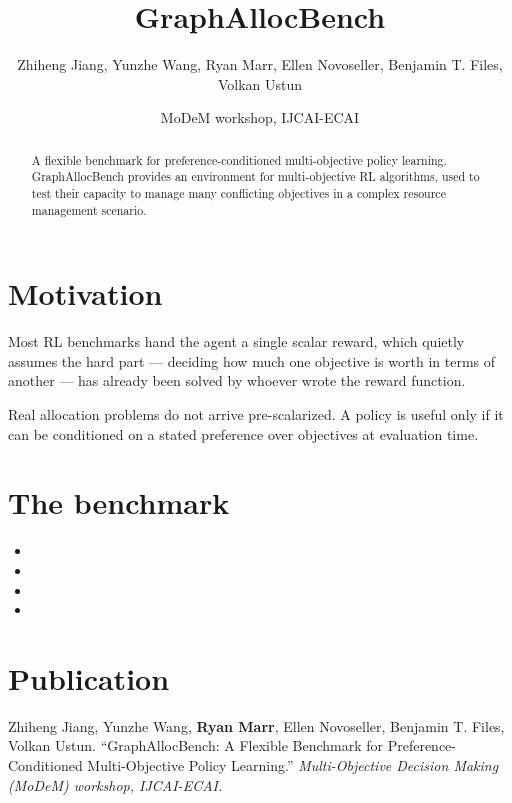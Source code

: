 \documentclass{article}
\title{GraphAllocBench}
\author{Zhiheng Jiang, Yunzhe Wang, Ryan Marr, Ellen Novoseller, Benjamin T. Files, Volkan Ustun}
\date{MoDeM workshop, IJCAI-ECAI}
\begin{document}
\maketitle

\begin{abstract}
A flexible benchmark for preference-conditioned multi-objective policy learning.
GraphAllocBench provides an environment for multi-objective RL algorithms, used to
test their capacity to manage many conflicting objectives in a complex resource
management scenario.
\end{abstract}

\section{Motivation}

Most RL benchmarks hand the agent a single scalar reward, which quietly assumes the
hard part --- deciding how much one objective is worth in terms of another --- has
already been solved by whoever wrote the reward function.

Real allocation problems do not arrive pre-scalarized. A policy is useful only if it
can be conditioned on a stated preference over objectives at evaluation time.

\section{The benchmark}

\begin{itemize}
  \item {}

  \item {}

  \item {}

  \item {}
\end{itemize}

\section{Publication}

Zhiheng Jiang, Yunzhe Wang, \textbf{Ryan Marr}, Ellen Novoseller, Benjamin T. Files,
Volkan Ustun. ``GraphAllocBench: A Flexible Benchmark for Preference-Conditioned
Multi-Objective Policy Learning.'' \textit{Multi-Objective Decision Making (MoDeM)
workshop, IJCAI-ECAI.}
\end{document}
